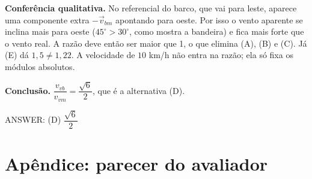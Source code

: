 \documentclass{article}%
\begin{document}
\textbf{Conferência qualitativa.} No referencial do barco, que vai para leste, aparece uma componente extra $-\vec v_{bm}$ apontando para oeste. Por isso o vento aparente se inclina mais para oeste ($45^\circ>30^\circ$, como mostra a bandeira) e fica mais forte que o vento real. A razão deve então ser maior que 1, o que elimina (A), (B) e (C). Já (E) dá $1{,}5\neq 1{,}22$. A velocidade de $10$ km/h não entra na razão; ela só fixa os módulos absolutos.

\textbf{Conclusão.} $\dfrac{v_{vb}}{v_{vm}}=\dfrac{\sqrt6}{2}$, que é a alternativa (D).

ANSWER: (D) $\dfrac{\sqrt6}{2}$%
\newpage%
\section*{Apêndice: parecer do avaliador}%
\end{document}
